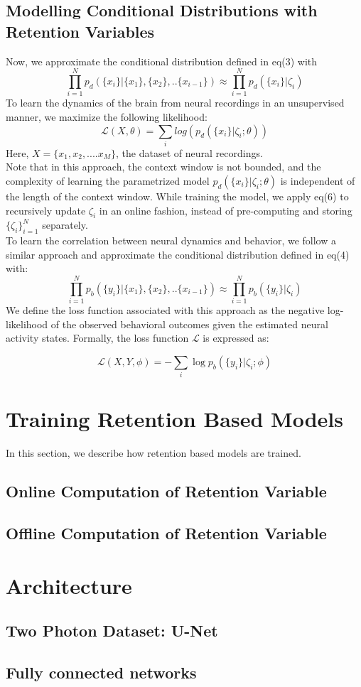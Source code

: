 \subsection{Modelling Conditional Distributions with Retention Variables}
Now, we approximate the conditional distribution defined in eq(3) with 
\begin{equation}
   \prod_{i=1}^{N} p_d(\{x_{i}\}| \{x_1\},\{x_2\},..\{x_{i-1}\}) 
   \approx  \prod_{i=1}^{N} p_d(\{x_{i}\}|\zeta_i)
\end{equation}
To learn the dynamics of the brain from neural recordings in an unsupervised manner, we maximize the following likelihood:
\begin{equation}
    \mathcal{L}(X,\theta) = \sum_i log(p_d(\{x_{i}\}|\zeta_i;\theta))
\end{equation}
Here, $X = \{x_1,x_2,....x_M\}$, the dataset of neural recordings. \\

Note that in this approach, the context window is not bounded, and the complexity of learning the parametrized model $p_d(\{x_{i}\}|\zeta_i;\theta)$ is independent of the length of the context window. While training the model, we apply eq(6) to recursively update $\zeta_i$ in an online fashion, instead of pre-computing and storing $\{\zeta_i\}_{i=1}^N$ separately.
 \\

 To learn the correlation between neural dynamics and behavior, we follow a similar approach and approximate the conditional distribution defined in eq(4) with:
\\
 \begin{equation}
   \prod_{i=1}^{N} p_b(\{y_{i}\}| \{x_1\},\{x_2\},..\{x_{i-1}\}) 
   \approx  \prod_{i=1}^{N} p_b(\{y_{i}\}|\zeta_i)
\end{equation}
We define the loss function associated with this approach as the negative log-likelihood of the observed behavioral outcomes given the estimated neural activity states. Formally, the loss function \( \mathcal{L} \) is expressed as:

\[
\mathcal{L}(X,Y,\phi) = -\sum_{i} \log p_b(\{y_i\}|\zeta_i;\phi)
\]

\section{Training Retention Based Models}
In this section, we describe how retention based models are trained. 
\subsection{Online Computation of Retention Variable}

\subsection{Offline Computation of Retention Variable}



\section{Architecture}
\subsection{Two Photon Dataset: U-Net}
\subsection{Fully connected networks}